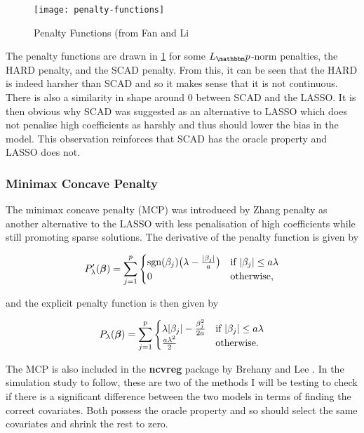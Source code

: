 \begin{figure}[ht!]
  \texttt{[image: penalty-functions]}
  \caption{Penalty Functions (from Fan and Li }
  \label{fig:penalty-functions}
\end{figure}

The penalty functions are drawn in \cref{fig:penalty-functions} for some $L_\p$-norm penalties, the HARD penalty, and the SCAD penalty. From this, it can be seen that the HARD is indeed harsher than SCAD and so it makes sense that it is not continuous. There is also a similarity in shape around 0 between SCAD and the LASSO. It is then obvious why SCAD was suggested as an alternative to LASSO which does not penalise high coefficients as harshly and thus should lower the bias in the model. This observation reinforces that SCAD has the oracle property and LASSO does not.

\subsubsection{Minimax Concave Penalty}\label{sec:MCV}

The minimax concave penalty (MCP) was introduced by Zhang  penalty as another alternative to the LASSO with less penalisation of high coefficients while still promoting sparse solutions. The derivative of the penalty function is given by

\begin{equation}
    P_\lambda'(\boldsymbol{\beta}) = \sum_{j=1}^p
    \begin{cases}
        \textrm{sgn}(\beta_j)\big(\lambda-\frac{|\beta_j|}{a}\big) &\textrm{if }|\beta_j|\leq a\lambda\\
        0 &\textrm{otherwise},
    \end{cases}
\end{equation}

and the explicit penalty function is then given by

\begin{equation}
    P_\lambda(\boldsymbol{\beta}) = \sum_{j=1}^p
    \begin{cases}
        \lambda|\beta_j| - \frac{\beta_j^2}{2a} &\textrm{if }|\beta_j|\leq a\lambda\\
        \frac{a\lambda^2}{2} &\textrm{otherwise}.
    \end{cases}
\end{equation}

The MCP is also included in the \textbf{ncvreg} package by Brehany and Lee . In the simulation study to follow, these are two of the methods I will be testing to check if there is a significant difference between the two models in terms of finding the correct covariates. Both possess the oracle property and so should select the same covariates and shrink the rest to zero.

